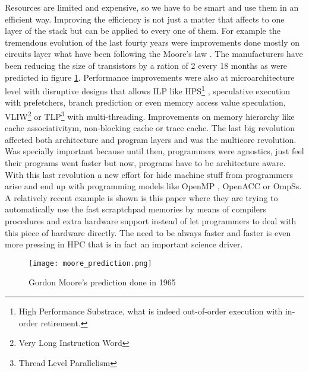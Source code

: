 Resources are limited and expensive, so we have to be smart and use them in an
efficient way. Improving the efficiency is not just a matter that affects to one
layer of the stack but can be applied to every one of them. For example the
tremendous evolution of the last fourty years were improvements done mostly on
circuits layer what have been following the Moore's law \cite{moore:1965}. The
manufacturers have been reducing the size of transistors by a ration of 2 every
18 months as were predicted in figure \ref{moore-prediction}. Performance improvements 
were also at microarchitecture level with
disruptive designs that allows ILP like HPS\footnote{High Performance Substrace,
what is indeed out-of-order execution with in-order retirement.}
\cite{Patt:1985:HNM:18927.18916}, speculative execution with prefetchers, 
branch prediction or even memory access value speculation,
VLIW\footnote{Very Long Instruction Word} or TLP\footnote{Thread Level
Parallelism} with multi-threading. Improvements on memory hierarchy like cache 
associativitym, non-blocking cache or trace cache. The last
big revolution affected both architecture and program layers and was the 
multicore revolution. Was specially important because until then, programmers were 
agnostics, just feel their programs went faster but now, programs have to be 
architecture aware. With this last revolution a new effort for hide machine stuff
from programmers arise and end up with programming models like OpenMP
\cite{openmp_new}, OpenACC\cite{openacc_new} or OmpSs\cite{ompss_new}. A relatively
recent example is shown is this paper \cite{Alvarez:2015:CPT:2872887.2750411}
where they are trying to automatically use the fast scraptchpad memories by
means of compilers procedures and extra hardware support instead
of let programmers to deal with this piece of hardware directly. The need to be 
always faster and faster is even more pressing in HPC that is in fact an
important science driver.

\begin{figure}
  \caption{Gordon Moore's prediction done in 1965}
  \label{moore-prediction}
  \centering
    \texttt{[image: moore\_prediction.png]}
\end{figure}


